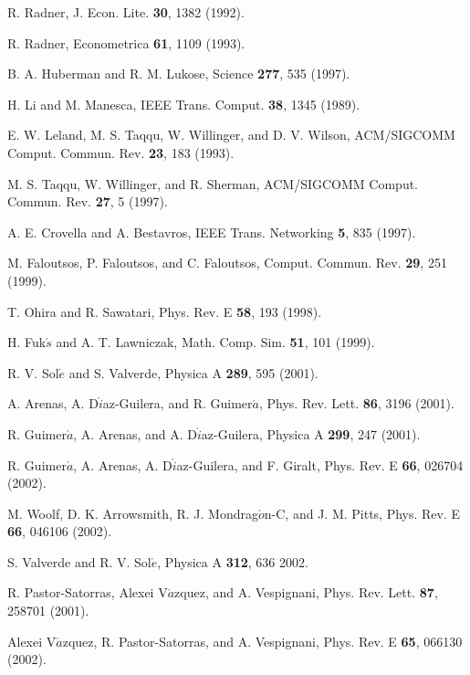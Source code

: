 \documentclass[aps,prl,twocolumn,superscriptaddress,showpacs]{revtex4}
\begin{document}
\begin{references}

R. Radner, J. Econ. Lite. {\bf 30}, 1382 (1992).

R. Radner, Econometrica {\bf 61}, 1109 (1993).

B. A. Huberman and R. M. Lukose, Science {\bf 277}, 535 (1997).

H. Li and M. Manesca, IEEE Trans. Comput. {\bf 38}, 1345 (1989).

E. W. Leland, M. S. Taqqu, W. Willinger, and D. V. Wilson,
ACM/SIGCOMM Comput. Commun. Rev. {\bf 23}, 183 (1993).

M. S. Taqqu, W. Willinger, and R. Sherman,
ACM/SIGCOMM Comput. Commun. Rev. {\bf 27}, 5 (1997).

A. E. Crovella and A. Bestavros, IEEE Trans. Networking
{\bf 5}, 835 (1997).

M. Faloutsos, P. Faloutsos, and C. Faloutsos,
Comput. Commun. Rev. {\bf 29}, 251 (1999).

T. Ohira and R. Sawatari, Phys. Rev. E {\bf 58}, 193 (1998).

H. Fuk$\acute{s}$ and A. T. Lawniczak, Math. Comp. Sim. {\bf 51}, 101 (1999).

R. V. Sol$\acute{e}$ and S. Valverde, Physica A {\bf 289}, 595
(2001).

A. Arenas, A. D$\acute{i}$az-Guilera, and R. Guimer$\acute{a}$,
Phys. Rev. Lett. {\bf 86}, 3196 (2001).

R. Guimer$\acute{a}$, A. Arenas, and A. D$\acute{i}$az-Guilera,
Physica A {\bf 299}, 247 (2001).

R. Guimer$\acute{a}$, A. Arenas, A. D$\acute{i}$az-Guilera, and F. Giralt,
Phys. Rev. E {\bf 66}, 026704 (2002).

M. Woolf, D. K. Arrowsmith, R. J. Mondrag$\acute{o}$n-C, and J. M. Pitts,
Phys. Rev. E {\bf 66}, 046106 (2002).

S. Valverde and R. V. Sol$\acute{e}$, Physica A {\bf 312}, 636 {2002}.

R. Pastor-Satorras, Alexei V$\acute{a}$zquez, and A. Vespignani,
Phys. Rev. Lett. {\bf 87}, 258701 (2001).

Alexei V$\acute{a}$zquez, R. Pastor-Satorras, and A. Vespignani,
Phys. Rev. E {\bf 65}, 066130 (2002).


\end{references}
\end{document}
